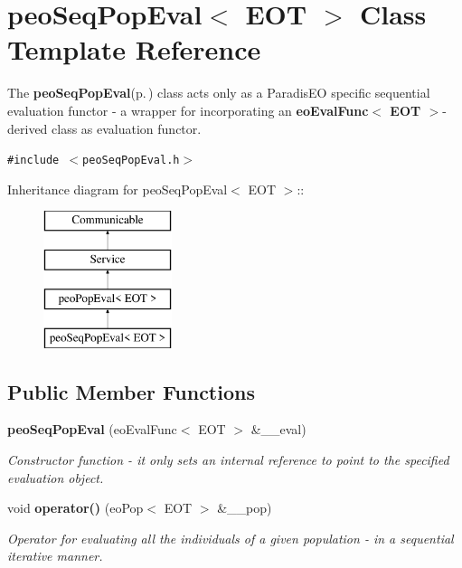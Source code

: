 \section{peo\-Seq\-Pop\-Eval$<$ EOT $>$ Class Template Reference}
\label{classpeo_seq_pop_eval}
The {\bf peo\-Seq\-Pop\-Eval}{\rm (p.\,\pageref{classpeo_seq_pop_eval})} class acts only as a Paradis\-EO specific sequential evaluation functor - a wrapper for incorporating an {\bf eo\-Eval\-Func$<$ EOT $>$}-derived class as evaluation functor.  


{\tt \#include $<$peo\-Seq\-Pop\-Eval.h$>$}

Inheritance diagram for peo\-Seq\-Pop\-Eval$<$ EOT $>$::\begin{figure}[H]
\begin{center}
\leavevmode
\includegraphics[height=4cm]{classpeo_seq_pop_eval}
\end{center}
\end{figure}
\subsection*{Public Member Functions}
\begin{CompactItemize}
\item 
{\bf peo\-Seq\-Pop\-Eval} (eo\-Eval\-Func$<$ EOT $>$ \&\_\-\_\-eval)
\begin{CompactList}\small\item\em Constructor function - it only sets an internal reference to point to the specified evaluation object. \item\end{CompactList}\item 
void {\bf operator()} (eo\-Pop$<$ EOT $>$ \&\_\-\_\-pop)
\begin{CompactList}\small\item\em Operator for evaluating all the individuals of a given population - in a sequential iterative manner. \item\end{CompactList}\end{CompactItemize}
